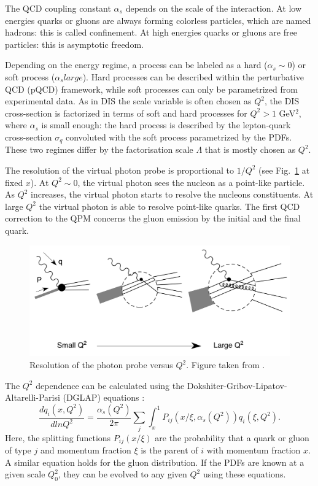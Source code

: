 The QCD coupling constant $\alpha_s$ depends on the scale of the interaction. At low energies quarks or gluons are always forming colorless particles, which are named hadrons: this is called confinement. At high energies quarks or gluons are free particles: this is asymptotic freedom.

Depending on the energy regime, a process can be labeled as a hard ($\alpha_s \sim 0$) or soft process ($\alpha_s large$). Hard processes can be described within the perturbative QCD (pQCD) framework, while soft processes can only be parametrized from experimental data. As in DIS the scale variable is often chosen as $Q^2$, the DIS cross-section is factorized \cite{CollinsSoper} in terms of soft and hard processes for $Q^2 > 1$ GeV$^2$, where $\alpha_s$ is small enough: the hard process is described by the lepton-quark cross-section $\sigma_q$ convoluted with the soft process parametrized by the PDFs. These two regimes differ by the factorisation scale $\Lambda$ that is mostly chosen as $Q^2$.

The resolution of the virtual photon probe is proportional to $1/Q^2$ (see Fig.~\ref{pic:Q2res} at fixed $x$). At $Q^2 \sim 0$, the virtual photon sees the nucleon as a point-like particle. As $Q^2$ increases, the virtual photon starts to resolve the nucleons constituents. At large $Q^2$ the virtual photon is able to resolve point-like quarks. The first QCD correction to the QPM concerns the gluon emission by the initial and the final quark.

\begin{figure}[!h]
  \centering
	\includegraphics[scale=0.6]{./gfx/Q2res.png}
	\caption{Resolution of the photon probe versus $Q^2$. Figure taken from \cite{PICH}.}
	\label{pic:Q2res}
\end{figure}

The $Q^2$ dependence can be calculated using the Dokshiter-Gribov-Lipatov-Altarelli-Parisi (DGLAP) equations \cite{Dokshitser, GL1, GL2, AP}:
%
\begin{equation}
  \frac{dq_i(x,Q^2)}{dlnQ^2} = \frac{\alpha_s(Q^2)}{2\pi}\sum\limits_{j}\int_{x}^{1}P_{ij}(x/\xi,\alpha_s(Q^2))q_i(\xi,Q^2).
\end{equation}
%
Here, the splitting functions $P_{ij}(x/\xi)$ \cite{Joosten} are the probability that a quark or gluon of type $j$ and momentum fraction $\xi$ is the parent of $i$ with momentum fraction $x$. A similar equation holds for the gluon distribution. If the PDFs are known at a given scale $Q_0^2$, they can be evolved to any given $Q^2$ using these equations.

